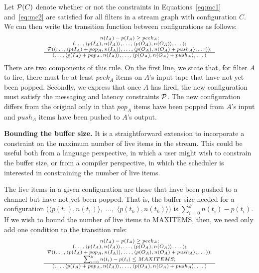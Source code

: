 Let ${\cal P}(C)$ denote whether or not the constraints in
Equations~\ref{eq:mc1} and~\ref{eq:mc2} are satisfied for all filters
in a stream graph with configuration $C$.  We can then write the
transition function between configurations as follows:
\[
\begin{scriptsize}
\begin{array}{c}
n(I_A) - p(I_A) \ge peek_A; \\ (\dots , \langle p(I_A), n(I_A) \rangle, \dots,
\langle p(O_A), n(O_A) \rangle, \dots); \\ {\cal P}((\dots , \langle p(I_A)+pop_A, n(I_A) \rangle, \dots,
\langle p(O_A), n(O_A)+push_A \rangle, \dots)); \\ \hline (\dots , \langle p(I_A)+pop_A,
n(I_A) \rangle, \dots, \langle p(O_A), n(O_A)+push_A \rangle, \dots)
\end{array}
\end{scriptsize}
\]
There are two components of this rule.  On the first line, we state
that, for filter $A$ to fire, there must be at least $peek_A$ items on
$A$'s input tape that have not yet been popped.  Secondly, we express
that once $A$ has fired, the new configuration must satisfy the
messaging and latency constraints ${\cal P}$.  The new configuration differs
from the original only in that $pop_A$ items have been popped from
$A$'s input and $push_A$ items have been pushed to $A$'s output.

{\bf Bounding the buffer size.}  It is a straightforward extension to
incorporate a constraint on the maximum number of live items in the
stream.  This could be useful both from a language perspective, in
which a user might wish to constrain the buffer size, or from a
compiler perspective, in which the scheduler is interested in
constraining the number of live items.

The live items in a given configuration are those that have been
pushed to a channel but have not yet been popped.  That is, the buffer
size needed for a configuration $(\langle p(t_1), n(t_1) \rangle,$
$\dots,$ $\langle p(t_k), n(t_k) \rangle)$ is $\sum_{i=0}^k n(t_i) -
p(t_i)$.  If we wish to bound the number of live items to MAXITEMS,
then, we need only add one condition to the transition rule:
\[
\begin{scriptsize}
\begin{array}{c}
n(I_A) - p(I_A) \ge peek_A; \\ (\dots , \langle p(I_A), n(I_A) \rangle, \dots,
\langle p(O_A), n(O_A) \rangle, \dots); \\ {\cal P}((\dots , \langle p(I_A)+pop_A, n(I_A) \rangle, \dots,
\langle p(O_A), n(O_A)+push_A \rangle, \dots)); \\ \sum_{i=0}^k n(t_i) - p(t_i) \le
MAXITEMS; \\ \hline (\dots , \langle p(I_A)+pop_A, n(I_A) \rangle, \dots, \langle p(O_A),
n(O_A)+push_A \rangle, \dots)
\end{array}
\end{scriptsize}
\]

